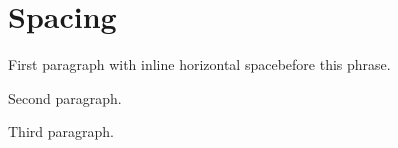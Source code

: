 \documentclass{article}
\begin{document}
\section{Spacing}
First paragraph with inline horizontal space\hspace{1em}before this phrase.

\vspace{6pt}

Second paragraph.

\vspace*{0.5cm}

Third paragraph.
\end{document}
